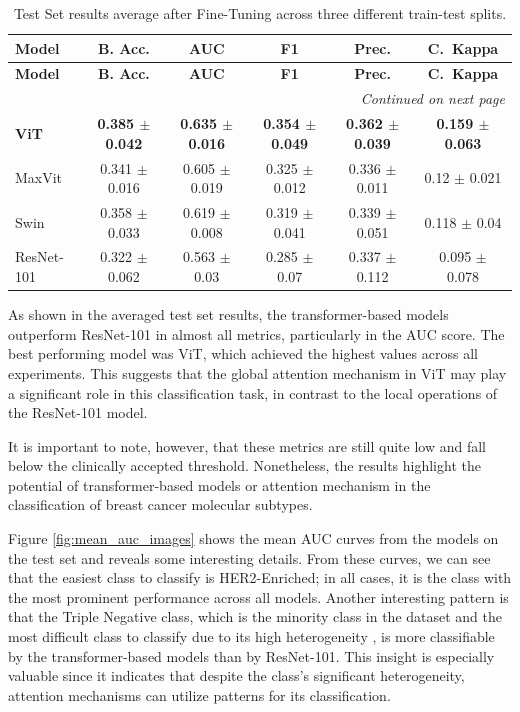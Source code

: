 \documentclass[a4paper,10pt]{book}
\begin{document}
\begin{scriptsize}
\begin{longtable}{@{}l c c c c c@{}}
\caption[Test set results averaged]{Test Set results average after Fine-Tuning across three different train-test splits.}
\label{tab:test_set_results_avg} \\
\toprule
\textbf{Model} & \textbf{B. Acc.} & \textbf{AUC} & \textbf{F1} & \textbf{Prec.}  & \textbf{C.\ Kappa}\\
\midrule
\endfirsthead

\toprule
\textbf{Model} & \textbf{B. Acc.} & \textbf{AUC} & \textbf{F1} & \textbf{Prec.} & \textbf{C.\ Kappa}\\
\midrule
\endhead

\midrule
\multicolumn{6}{r}{\textit{Continued on next page}}\\
\midrule
\endfoot

\bottomrule
\endlastfoot
     \textbf{ViT} & \textbf{0.385 $\pm$ 0.042} & \textbf{0.635  $\pm$ 0.016} & \textbf{0.354  $\pm$ 0.049} & \textbf{0.362  $\pm$ 0.039} & \textbf{0.159  $\pm$ 0.063}  \\
     MaxVit & 0.341 $\pm$ 0.016 & 0.605 $\pm$  0.019 & 0.325 $\pm$  0.012 & 0.336 $\pm$  0.011 & 0.12 $\pm$  0.021 \\
    Swin & 0.358 $\pm$  0.033 & 0.619 $\pm$  0.008 & 0.319 $\pm$  0.041 & 0.339 $\pm$  0.051 & 0.118 $\pm$  0.04 \\
    ResNet-101 & 0.322 $\pm$  0.062 & 0.563 $\pm$  0.03 & 0.285 $\pm$  0.07 & 0.337 $\pm$  0.112 & 0.095 $\pm$  0.078 \\
\end{longtable}
\end{scriptsize}


As shown in the averaged test set results, the transformer-based models outperform ResNet-101 in almost all metrics, particularly in the AUC score. The best performing model was ViT, which achieved the highest values across all experiments. This suggests that the global attention mechanism in ViT may play a significant role in this classification task, in contrast to the local operations of the ResNet-101 model.

It is important to note, however, that these metrics are still quite low and fall below the clinically accepted threshold. Nonetheless, the results highlight the potential of transformer-based models or attention mechanism in the classification of breast cancer molecular subtypes.

Figure \ref{fig:mean_auc_images} shows the mean AUC curves from the models on the test set and reveals some interesting details. From these curves, we can see that the easiest class to classify is HER2-Enriched; in all cases, it is the class with the most prominent performance across all models. Another interesting pattern is that the Triple Negative class, which is the minority class in the dataset and the most difficult class to classify due to its high heterogeneity \cite{sinn_triple-negative_2023}, is more classifiable by the transformer-based models than by ResNet-101. This insight is especially valuable since it indicates that despite the class's significant heterogeneity, attention mechanisms can utilize patterns for its classification.
\end{document}
